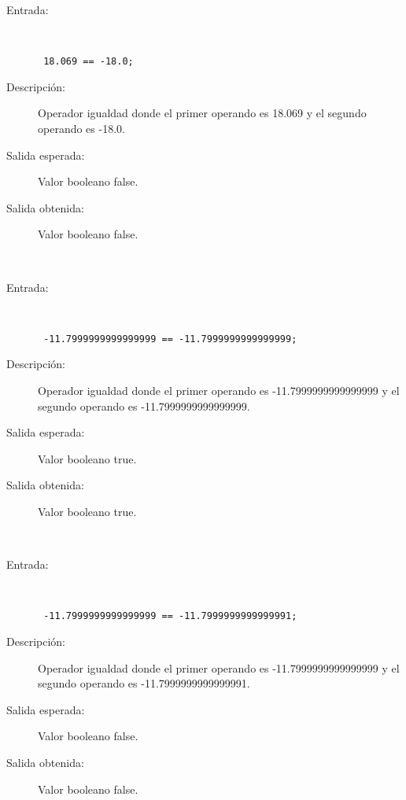 	\begin{description}
		\item [Entrada:] \hfill \\
\begin{lstlisting}
 18.069 == -18.0;
\end{lstlisting}
		\item [Descripción:] Operador igualdad donde el primer operando es 18.069 y el segundo operando es  -18.0.
		\item [Salida esperada:] Valor booleano false.
		\item [Salida obtenida:] Valor booleano false.
	\end{description}
\hfil \\
	\begin{description}
		\item [Entrada:] \hfill \\
\begin{lstlisting}
 -11.7999999999999999 == -11.7999999999999999;
\end{lstlisting}
		\item [Descripción:] Operador igualdad donde el primer operando es -11.7999999999999999 y el segundo operando es  -11.7999999999999999.
		\item [Salida esperada:] Valor booleano true.
		\item [Salida obtenida:] Valor booleano true.
	\end{description}
\hfil \\
	\begin{description}
		\item [Entrada:] \hfill \\
\begin{lstlisting}
 -11.7999999999999999 == -11.7999999999999991;
\end{lstlisting}
		\item [Descripción:] Operador igualdad donde el primer operando es -11.7999999999999999 y el segundo operando es  -11.7999999999999991.
		\item [Salida esperada:] Valor booleano false.
		\item [Salida obtenida:] Valor booleano false.
	\end{description}
